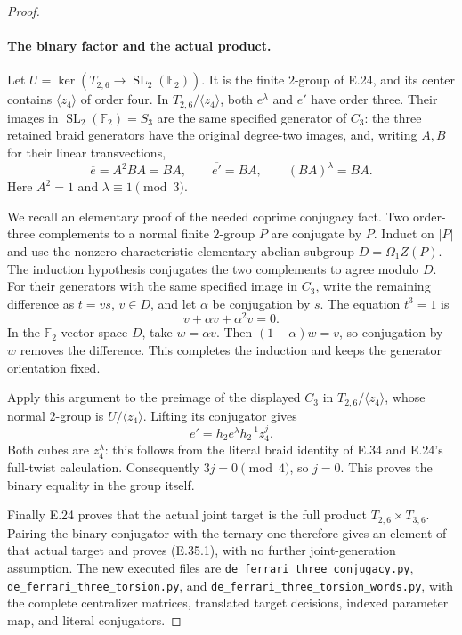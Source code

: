 \begin{proof}
\paragraph{The binary factor and the actual product.}
Let $U=\ker(T_{2,6}\to\operatorname{SL}_2(\mathbb F_2))$.
It is the finite $2$-group of E.24, and its center
contains $\langle z_4\rangle$ of order four. In
$T_{2,6}/\langle z_4\rangle$, both $e^\lambda$ and
$e'$ have order three. Their images in
$\operatorname{SL}_2(\mathbb F_2)=S_3$ are the same
specified generator of $C_3$: the three retained
braid generators have the original degree-two images,
and, writing $A,B$ for their linear transvections,
\[
     \overline e=A^2BA=BA,
     \qquad\overline {e'}=BA,
     \qquad(BA)^\lambda=BA.
 \tag{E.35.11}
\]
Here $A^2=1$ and $\lambda\equiv1\pmod3$.

We recall an elementary proof of the needed
coprime conjugacy fact. Two order-three complements
to a normal finite $2$-group $P$ are conjugate by
$P$. Induct on $|P|$ and use the nonzero characteristic
elementary abelian subgroup $D=\Omega_1Z(P)$.
The induction hypothesis conjugates the two
complements to agree modulo $D$. For their generators
with the same specified image in $C_3$, write the
remaining difference as $t=vs$, $v\in D$, and let
$\alpha$ be conjugation by $s$. The equation $t^3=1$
is
\[
             v+\alpha v+\alpha^2v=0.
\]
In the $\mathbb F_2$-vector space $D$, take
$w=\alpha v$. Then
$(1-\alpha)w=v$, so conjugation by $w$ removes
the difference. This completes the induction and
keeps the generator orientation fixed.

Apply this argument to the preimage of the displayed
$C_3$ in $T_{2,6}/\langle z_4\rangle$, whose normal
$2$-group is $U/\langle z_4\rangle$. Lifting its
conjugator gives
\[
              e'=h_2e^\lambda h_2^{-1}z_4^j.
\]
Both cubes are $z_4^\lambda$: this follows from the
literal braid identity of E.34 and E.24's full-twist
calculation. Consequently $3j=0\pmod4$, so $j=0$.
This proves the binary equality in the group itself.

Finally E.24 proves that the actual joint target is
the full product $T_{2,6}\times T_{3,6}$. Pairing the
binary conjugator with the ternary one therefore
gives an element of that actual target and proves
(E.35.1), with no further joint-generation assumption.
The new executed files are
\texttt{de\_ferrari\_three\_conjugacy.py},
\texttt{de\_ferrari\_three\_torsion.py}, and
\texttt{de\_ferrari\_three\_torsion\_words.py},
with the complete centralizer matrices, translated
target decisions, indexed parameter map, and literal
conjugators.
\end{proof}
